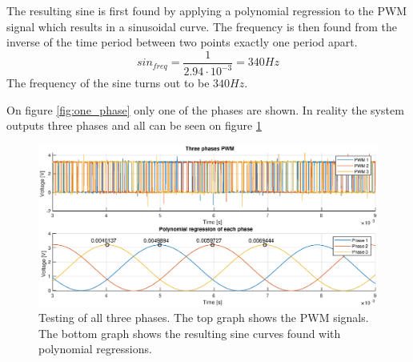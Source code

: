 The resulting sine is first found by applying a polynomial regression to the PWM signal which results in a sinusoidal curve. The frequency is then found from the inverse of the time period between two points exactly one period apart. 
\begin{equation}
    sin_{freq} = \frac{1}{2.94 \cdot 10^{-3}} = 340 Hz
\end{equation}
The frequency of the sine turns out to be $340Hz$.

On figure \ref{fig:one_phase} only one of the phases are shown. In reality the system outputs three phases and all can be seen on figure \ref{fig:three_phases}
\begin{figure}[H]
	\centering
	\includegraphics[width=1 \textwidth]{pictures/software/three_phases.eps}
	\caption{Testing of all three phases. The top graph shows the PWM signals. The bottom graph shows the resulting sine curves found with polynomial regressions.}
	\label{fig:three_phases}
\end{figure}


